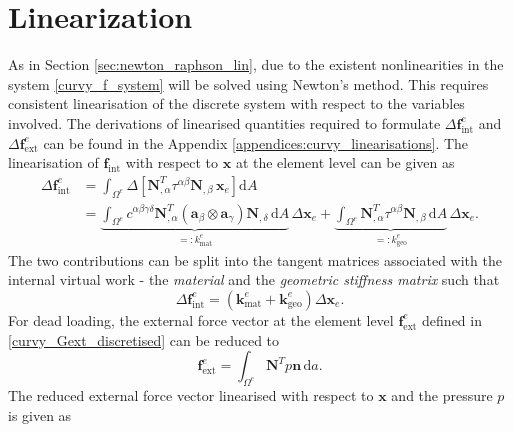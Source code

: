 \section{Linearization}
As in Section \ref{sec:newton_raphson_lin}, due to the existent nonlinearities in the system \eqref{curvy_f_system} will be solved using Newton's method. 
 This requires consistent linearisation of the discrete system with respect to the variables involved. 
 The derivations of linearised quantities required to formulate $\Delta \mathbf{f}_{\text{int}}^{e}$ and $\Delta \mathbf{f}_{\text{ext}}^{e}$ can be found in the Appendix \ref{appendices:curvy_linearisations}.
 The linearisation of $\mathbf{f}_{\text{int}}$ with respect to $\mathbf{x}$ at the element level can be given as
\begin{equation}\label{eq:del_fint_def}
    \begin{split}
        \Delta \mathbf{f}_{\mathrm{int}}^{e} &= \int_{\Omega^{e}} \Delta \left[\mathbf{N}^{T}_{, \alpha} \tau^{\alpha \beta} \mathbf{N}_{, \beta} \, \mathbf{x}_{e}\right] \mathrm{d} A\\ 
        &= \underbrace{\int_{\Omega^{e}} c^{\alpha \beta \gamma \delta} \mathbf{N}_{, \alpha}^{T} \left( \boldsymbol{a}_{\beta} \otimes \boldsymbol{a}_{\gamma} \right) \mathbf{N}_{, \delta} \, \mathrm{d} A}_{=: k_{\mathrm{mat}}^{e}} \,\Delta \mathbf{x}_{e} + \underbrace{\int_{\Omega^{e}} \mathbf{N}_{,\alpha}^{T} \tau^{\alpha \beta} \mathbf{N}_{, \beta} \, \mathrm{d} A}_{=: k_{\mathrm{geo}}^{e}} \,\Delta \mathbf{x}_{e}.
    \end{split}
\end{equation}
The two contributions can be split into the tangent matrices associated with the internal virtual work - the \emph{material} and the \emph{geometric stiffness matrix} such that
\begin{equation}\label{eq:del_f_int_3}
\Delta \mathbf{f}_{\mathrm{int}}^{e} = \left(\mathbf{k}_{\text{mat}}^{e} + \mathbf{k}_{\text{geo}}^{e} \right) \Delta \mathbf{x}_{e}.
\end{equation}
For dead loading, the external force vector at the element level $\mathbf{f}_{\text{ext}}^{e}$ defined in \eqref{curvy_Gext_discretised} can be reduced to
\begin{equation}\label{eq:f_ext_dead}
\mathbf{f}_{\mathrm{ext}}^{e} = \int_{\Omega^{e}} \mathbf{N}^{T} p \boldsymbol{n} \, \mathrm{d} a.
\end{equation}
The reduced external force vector linearised with respect to $\mathbf{x}$ and the pressure $p$ is given as
